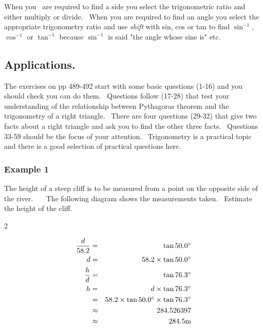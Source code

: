 When you \ are required to find a side you select the trigonometric ratio and either multiply or divide.
\ When you are required to find an angle you select the appropriate trigonometry ratio and use \emph{shift}
with sin, cos or tan to find $\sin ^{ -1}$, $\cos ^{ -1}$ or $\tan ^{ -1}$ because $\sin ^{ -1}$ is said "the angle whose sine is" etc. 

\subsection{Applications.}
The exercises on pp 489-492 start with some basic questions (1-16) and you should check you can do them. \ Questions
follow (17-28) that test your understanding of the relationship between Pythagoras theorem and the trigonometry of a right triangle. \ There
are four questions (29-32) that give two facts about a right triangle and ask you to find the other three facts. \ Questions
33-59 should be the focus of your attention. \ Trigonometry is a practical topic and there is a good selection
of practical questions here. 

\subsubsection{Example 1}
The height of a steep cliff is to be measured from a point on the opposite side of the river. \ \ \ The
following diagram shows the measurements taken. \ Estimate the height of the cliff. 


\columnsep =30pt
\begin {multicols}{2}
 

   
\setlength\fboxrule{0in}\setlength\fboxsep{0.2in}



\begin{align*}\frac{d}{58.2} &  = & \tan  50.0 \mbox{{\ensuremath{{}^\circ}}} \\
d &  = & 58.2 \times \tan  50.0 \mbox{{\ensuremath{{}^\circ}}} \\
\frac{h}{d} &  = & \tan  76.3 \mbox{{\ensuremath{{}^\circ}}} \\
h &  = & d \times \tan  76.3 \mbox{{\ensuremath{{}^\circ}}} \\
 &  = & 58.2 \times \tan  50.0 \mbox{{\ensuremath{{}^\circ}}} \times \tan  76.3 \mbox{{\ensuremath{{}^\circ}}} \\
 &  \approx  & 284.526397 \\
 &  \approx  & 284.5 \mbox{m}\end{align*}


\end {multicols}


